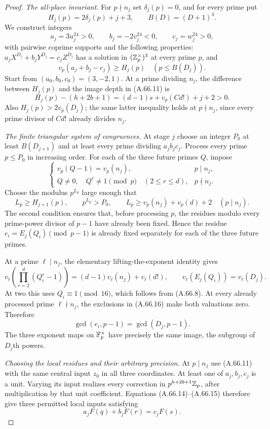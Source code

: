 \begin{proof}
\emph{The all-place invariant.}
For $p\nmid n_j$ set $\delta_j(p)=0$, and for every prime put
\[
 H_j(p)=2\delta_j(p)+j+3,\qquad B(D)=(D+1)^4.
 \tag{A.66.12}
\]
We construct integers
\[
 a_j=3u_j^{24}>0,\qquad b_j=-2v_j^{24}<0,
                    \qquad c_j=w_j^{24}>0,
 \tag{A.66.13}
\]
with pairwise coprime supports and the following properties:
$a_jX^{D_j}+b_jY^{D_j}=c_jZ^{D_j}$ has a solution
in $(\mathbb Z_p^\times)^3$ at every prime $p$, and
\[
 v_p(a_j+b_j-c_j)\ge H_j(p)
                              \quad(p\le B(D_j)).
 \tag{A.66.14}
\]
Start from $(a_0,b_0,c_0)=(3,-2,1)$.
At a prime dividing $n_j$, the difference between $H_j(p)$
and the image depth in (A.66.11) is
\[
 H_j(p)-(h+2b+1)
            =(d-1)s+v_p(Cd!)+j+2>0.
 \tag{A.66.15}
\]
Also $H_j(p)>2v_p(D_j)$; the same latter inequality holds
at $p\nmid n_j$, since every prime divisor of $Cd!$
already divides $n_j$.

\emph{The finite triangular system of congruences.}
At stage $j$ choose an integer $P_0$ at least $B(D_{j+1})$
and at least every prime dividing $a_jb_jc_j$.  Process
every prime $p\le P_0$ in increasing order.
For each of the three future primes $Q$, impose
\[
 \begin{cases}
 v_p(Q-1)=v_p(n_j),&p\mid n_j,\\
 Q\ne0,\quad Q^r\ne1\pmod p\quad(2\le r\le d),
                                               &p\nmid n_j.
 \end{cases}
 \tag{A.66.16}
\]
Choose the modulus $p^{L_p}$ large enough that
\[
 L_p\ge H_{j+1}(p),\qquad p^{L_p}>P_0,
 \qquad L_p\ge v_p(n_j)+v_p(d)+2\quad(p\mid n_j).
 \tag{A.66.17}
\]
The second condition ensures that, before processing $p$,
the residues modulo every prime-power divisor of $p-1$
have already been fixed.  Hence the residue
$e_i=E_j(Q_i)\pmod{p-1}$ is already fixed separately for
each of the three future primes.

At a prime $\ell\mid n_j$, the elementary lifting-the-exponent
identity gives
\[
 v_\ell\left(\prod_{r=2}^d(Q_i^r-1)\right)
       =(d-1)v_\ell(n_j)+v_\ell(d!),
 \qquad v_\ell(E_j(Q_i))=v_\ell(D_j).
 \tag{A.66.18}
\]
At two this uses $Q_i\equiv1\pmod{16}$, which follows
from (A.66.8).  At every already processed prime
$\ell\nmid n_j$, the exclusions in (A.66.16) make both
valuations zero.  Therefore
\[
                  \gcd(e_i,p-1)=\gcd(D_j,p-1).
 \tag{A.66.19}
\]
The three exponent maps on $\mathbb F_p^\times$ have precisely
the same image, the subgroup of $D_j$th powers.

\emph{Choosing the local residues and their arbitrary precision.}
At $p\mid n_j$ use (A.66.11) with the same central input
$z_0$ in all three coordinates.  At least one of
$a_j,b_j,c_j$ is a unit.  Varying its input realizes
every correction in $p^{h+2b+1}\mathbb Z_p$, after multiplication
by that unit coefficient.  Equations (A.66.14)--(A.66.15)
therefore give three permitted local inputs satisfying
\[
                   a_jF(q)+b_jF(r)=c_jF(s).
 \tag{A.66.20}
\]


\end{proof}
